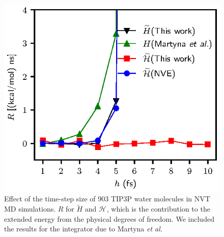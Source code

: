 \documentclass[
journal=jctcce,
layout=twocolumn
]{achemso}
\newcommand{\Ham}[1]{{\mathcal H}_\text{#1}}    %
\begin{document}
\begin{figure}
	\includegraphics{Figures/energy_drift.eps}
    \caption{Effect of the time-step size of 903 TIP3P \cite{Jorgensen_1983} water molecules in NVT MD simulations. $R$ for $\widetilde{H}$ and $\Ham{}$, which is the contribution to the extended energy from the physical degrees of freedom. We included the results for the integrator due to Martyna \textit{et al.} \cite{Martyna_1996}
}
	\label{fig:energy_drift}
\end{figure}
\end{document}
